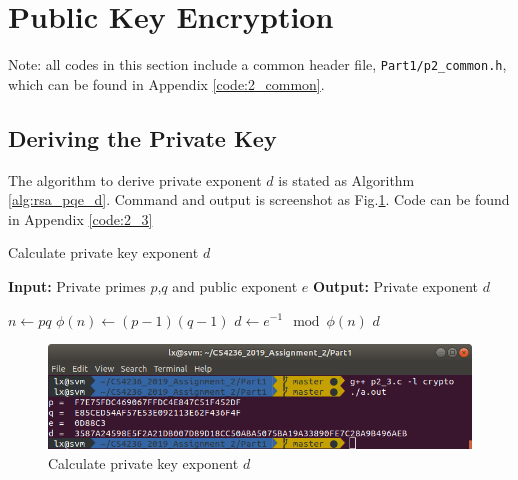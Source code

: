 \section{Public Key Encryption}

Note: all codes in this section include a common header file, \texttt{Part1/p2\_common.h}, which can be found in Appendix \ref{code:2_common}.

\setcounter{subsection}{2}
\subsection{Deriving the Private Key}

The algorithm to derive private exponent $d$ is stated as Algorithm \ref{alg:rsa_pqe_d}.
Command and output is screenshot as Fig.\ref{fig:p2_3}.
Code can be found in Appendix \ref{code:2_3}

\begin{algorithm}
\caption{Calculate private key exponent $d$}
\label{alg:rsa_pqe_d}
\begin{algorithmic}
\STATE \textbf{Input:} Private primes $p$,$q$ and public exponent $e$
\STATE \textbf{Output:} Private exponent $d$

\STATE $ n \gets pq $
\STATE $ \phi(n) \gets (p-1)(q-1) $
\STATE $ d \gets e^{-1} \mod{\phi(n)} $
\RETURN $ d $
\end{algorithmic}
\end{algorithm}

\begin{figure}[t!]
\centering
\includegraphics[width=\columnwidth]{pictures/p2_3.png}
\caption{
    Calculate private key exponent $d$
}
\label{fig:p2_3}
\end{figure}

